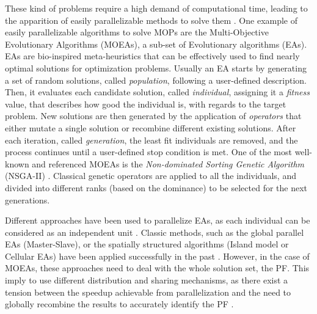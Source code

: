 \documentclass[preprint]{elsarticle}
\begin{document}
These kind of problems require a high demand of computational time, leading to the apparition of easily parallelizable methods to solve them \citep{Luna15Survey,Mukhopadhyay14Survey,Chavez15MO,Hidalgo16residualstress}.
One example of easily parallelizable algorithms to solve MOPs are the Multi-Objective Evolutionary Algorithms (MOEAs), a sub-set of Evolutionary algorithms (EAs). EAs \citep{DBLP:series/ncs/EibenS15} are bio-inspired meta-heuristics that can be effectively used to find nearly optimal solutions for optimization problems. Usually an EA starts by generating a set of random solutions, called \emph{population}, following a user-defined description. Then, it evaluates each candidate solution, called \emph{individual}, assigning it a \emph{fitness} value, that describes how good the individual is, with regards to the target problem. New solutions are then generated by the application of \emph{operators} that either mutate a single solution or recombine different existing solutions. After each iteration, called \emph{generation}, the least fit individuals are removed, and the process continues until a user-defined stop condition is met. One of the most well-known and referenced MOEAs \citep{Dorronsoro13superlinear} is the {\em
  Non-dominated Sorting Genetic Algorithm} (NSGA-II)
\citep{Deb00NSGAII}. Classical genetic operators are applied to all
the individuals, and divided into different ranks (based on the
dominance) to be selected for the next generations. 


Different approaches have been used to parallelize EAs, as each individual can be considered as an
independent unit \citep{Alba13parallel}. Classic methods, such as the
global parallel EAs (Master-Slave), or the spatially structured
algorithms (Island model or Cellular EAs) have been applied
successfully in the past \citep{Folino03cellular,Alba02Parallelism}.
However, in the case of MOEAs, these
approaches \citep{Luna15Survey} need to deal with the whole solution set, the PF.
 This imply to use different distribution
and sharing mechanisms, as there exist a tension between the speedup
achievable from parallelization and the need to globally recombine the
results to accurately identify the PF
\citep{Branke04Parallelizingcone}. 
\end{document}
